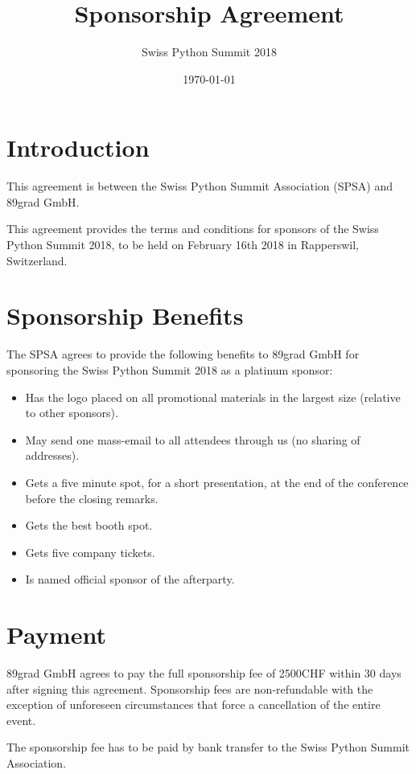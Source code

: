 \documentclass[11pt,enlargefirstpage=true,headlines=4]{scrartcl}
\title{Sponsorship Agreement}
\subtitle{Swiss Python Summit 2018}
\date{\today} %
\begin{document}
    \maketitle

    \section{Introduction}

    This agreement is between the Swiss Python Summit Association (SPSA) and
    89grad GmbH.

    This agreement provides the terms and conditions for sponsors of the Swiss
    Python Summit 2018, to be held on February 16th 2018 in Rapperswil,
    Switzerland.

    \section{Sponsorship Benefits}

    The SPSA agrees to provide the following benefits to 89grad GmbH for sponsoring
    the Swiss Python Summit 2018 as a platinum sponsor:

    \begin{itemize}
        \item Has the logo placed on all promotional materials in the largest size (relative to other sponsors).
        \item May send one mass-email to all attendees through us (no sharing of addresses).
        \item Gets a five minute spot, for a short presentation, at the end of the conference before the closing remarks.
        \item Gets the best booth spot.
        \item Gets five company tickets.
        \item Is named official sponsor of the afterparty.
    \end{itemize}

    \section{Payment}

    89grad GmbH agrees to pay the full sponsorship fee of 2500CHF within 30 days
    after signing this agreement. Sponsorship fees are non‐refundable with the
    exception of unforeseen circumstances that force a cancellation of the entire
    event.

    The sponsorship fee has to be paid by bank transfer to the Swiss Python
    Summit Association.

    \quad
\end{document}
